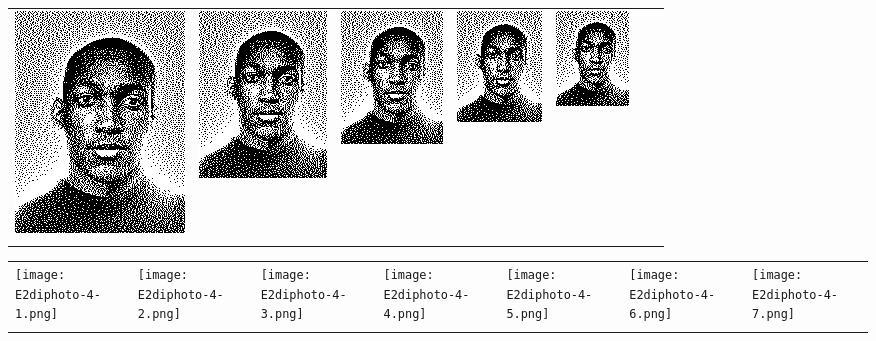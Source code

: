\begin{tabular}{lllllll}
	\includegraphics{Ediphoto-4-3.png} &
	\includegraphics{Ediphoto-4-4.png} &
	\includegraphics{Ediphoto-4-5.png} &
	\includegraphics{Ediphoto-4-6.png} &
	\includegraphics{Ediphoto-4-7.png} \\
	 &
	 &
	 &
	 &
	 &
	 &
	 \\
\end{tabular}
\begin{tabular}{lllllll}
	\texttt{[image: E2diphoto-4-1.png]} &
	\texttt{[image: E2diphoto-4-2.png]} &
	\texttt{[image: E2diphoto-4-3.png]} &
	\texttt{[image: E2diphoto-4-4.png]} &
	\texttt{[image: E2diphoto-4-5.png]} &
	\texttt{[image: E2diphoto-4-6.png]} &
	\texttt{[image: E2diphoto-4-7.png]} \\
	 &
	 &
	 &
	 &
	 &
	 &
	 \\
\end{tabular}

